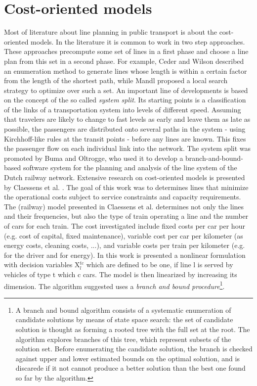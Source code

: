 \documentclass[
  twoside,
  11pt, a4paper,
  footinclude=true,
  headinclude=true,
  cleardoublepage=empty
]{book}
\theoremstyle{definition}
\begin{document}
\section{Cost-oriented models}
Most of literature about line planning in public transport is about the cost-oriented models. \newline
In the literature it is common to work in two step approaches. These approaches precompute some set of lines in a first phase and choose a line plan from this set in a second phase. For example, Ceder and Wilson \cite{ceder:art} described an enumeration method to generate lines whose length is within a certain factor from the length of the shortest path, while Mandl \cite{mandl:art}proposed a local search strategy to optimize over such a set. \newline
An important line of developments is based on the concept of the so called \emph{system split}. Its starting points is a classification of the links of a transportation system into levels of different speed. Assuming that travelers are likely to change to fast levels as early and leave them as late as possible, the passengers are distributed onto several paths in the system - using Kirchhoff-like rules at the transit points - before any lines are known. This fixes the passenger flow on each individual link into the network. The system split was promoted by Buma and Oltrogge\cite{BoumaOltrogge:art}, who used it to develop a branch-and-bound-based software system for the planning and analysis of the line system of the Dutch railway network.
Extensive research on cost-oriented models is presented by Claessens et al. \cite{clae:art}. The goal of this work was to determines lines that minimize the operational costs subject to service constraints and capacity requirements. The (railway) model presented in Claessens et al. determines not only the lines and their frequencies, but also the type of train operating a line and the number of cars for each train. The cost investigated include fixed costs per car per hour (e.g. cost of capital, fixed maintenance), variable cost per car per kilometer (as energy costs, cleaning costs, ...), and variable costs per train per kilometer (e.g. for the driver and for energy). In this work is presented a nonlinear formulation with decision variables X$^{tc}_l$ which are defined to be one, if line l is served by vehicles of type t which c cars. The model is then linearized by increasing its dimension. The algorithm suggested uses a \emph{branch and bound procedure}\footnote{A branch and bound algorithm consists of  a systematic enumeration of candidate solutions by means of state space search: the set of candidate solution is thought as forming a rooted tree with the full set at the root. The algorithm explores branches of this tree, which represent subsets of the solution set. Before enumerating the candidate solution, the branch is checked against upper and lower estimated bounds on the optimal solution, and is discarede if it not cannot produce a better solution than the best one found so far by the algorithm.}. \newline
\end{document}
